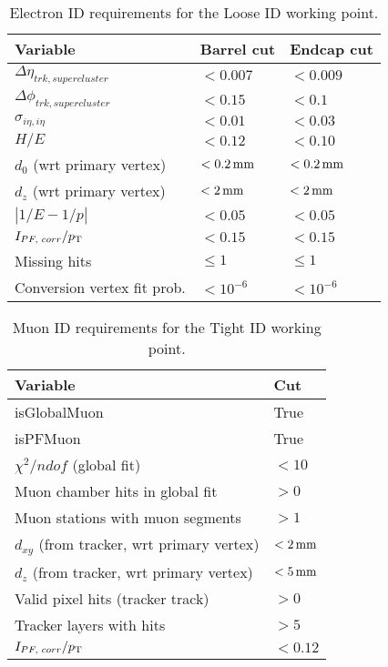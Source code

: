 \begin{table}[htb]
\caption{Electron ID requirements for the Loose ID working point.}
\label{tab:electronid}
\vspace*{\medskipamount}
\begin{center}
\small
\begin{tabular}{|l|l|l|}
\hline
Variable & Barrel cut & Endcap cut  \\
\hline
$\Delta \eta_{trk, supercluster}$ & $<0.007$ & $<0.009$ \\
$\Delta \phi_{trk, supercluster}$ & $<0.15$ & $<0.1$ \\
$\sigma_{i\eta, i\eta}$ & $<0.01$ & $<0.03$ \\
$H/E$ & $<0.12$ & $<0.10$ \\
$d_{0}$ (wrt primary vertex) & $< 0.2 \,\text{mm}$ & $< 0.2 \,\text{mm}$ \\
$d_z$ (wrt primary vertex) & $< 2 \,\text{mm}$ & $< 2 \,\text{mm}$ \\
$|1/E - 1/p|$ & $< 0.05$ & $<0.05$ \\
$I_{PF, \,\, corr}/p_{\mathrm{T}}$ & $< 0.15$ & $<0.15$ \\
Missing hits & $\le 1$ & $\le 1$ \\
Conversion vertex fit prob.& $< 10^{-6}$ & $< 10^{-6}$ \\
\hline
\end{tabular}
\end{center}
\end{table}

\begin{table}[htb]
\caption{Muon ID requirements for the Tight ID working point.}
\label{tab:muonid}
\vspace*{\medskipamount}
\begin{center}
\small
\begin{tabular}{|l|l|}
\hline
Variable & Cut  \\
\hline
isGlobalMuon & True \\
isPFMuon & True \\
$\chi^2 / ndof$ (global fit) & $<10$ \\
Muon chamber hits in global fit & $>0$ \\
Muon stations with muon segments & $>1$ \\
$d_{xy}$ (from tracker, wrt primary vertex) & $< 2 \,\text{mm}$  \\
$d_z$ (from tracker, wrt primary vertex) & $< 5 \,\text{mm}$  \\
Valid pixel hits (tracker track) & $> 0$ \\
Tracker layers with hits & $>5$ \\
$I_{PF, \,\, corr}/p_{\mathrm{T}}$ & $< 0.12$ \\
\hline
\end{tabular}
\end{center}
\end{table}


